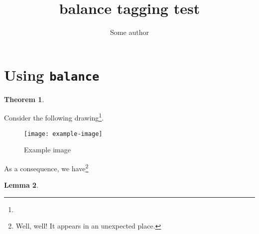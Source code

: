 \documentclass[11pt,a4paper,twocolumn]{article}
\title{balance tagging test}
\author{Some author}
\newtheorem{thm}{Theorem}[section]
\newtheorem{lem}[thm]{Lemma}
\begin{document}
\maketitle

\lipsum[1]

\section{Using \texttt{balance}}

\lipsum[2]
\begin{thm}
  \lipsum[3]
\end{thm}

\lipsum[4]

Consider the following drawing\footnote{\lipsum[21]}.
\begin{figure}[ht!]
  \centering
  \texttt{[image: example-image]}
  \caption{Example image}
\end{figure}

\lipsum[5]

\balance

As a consequence, we have\footnote{Well, well!  It appears in an
  unexpected place.}

\begin{lem}
  \lipsum[6]
\end{lem}
\end{document}
